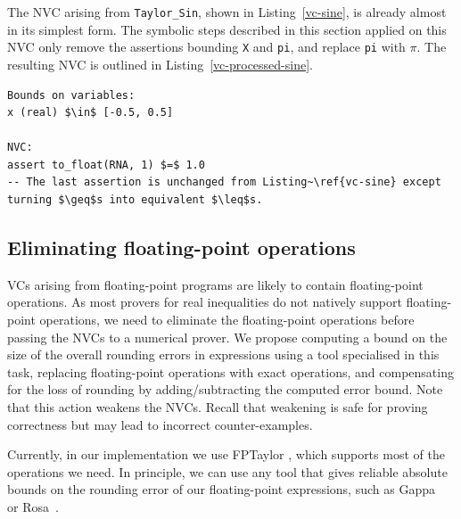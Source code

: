 \documentclass[runningheads]{llncs}
\begin{document}
The NVC arising from \lstinline{Taylor_Sin}, shown in Listing~\ref{vc-sine}, is already almost in its simplest form.  
The symbolic steps described in this section applied on this NVC only remove the assertions bounding \lstinline{X} and \lstinline{pi}, and replace \lstinline{pi} with $\pi$. 
The resulting NVC is outlined in Listing~\ref{vc-processed-sine}.

\begin{lstlisting}[float=t,caption=\lstinline{Taylor_Sin} NVC after simplification and bounds derivation, label=vc-processed-sine,basicstyle=\fontsize{7.5}{9pt}\tt]
Bounds on variables:
x (real) $\in$ [-0.5, 0.5] 

NVC:
assert to_float(RNA, 1) $=$ 1.0
-- The last assertion is unchanged from Listing~\ref{vc-sine} except turning $\geq$s into equivalent $\leq$s.
\end{lstlisting}

\subsection{Eliminating floating-point operations}\label{sec:elim:rounding}

VCs arising from floating-point programs are likely to contain floating-point operations.
As most provers for real inequalities do not natively support floating-point operations, we need to eliminate the floating-point operations before passing the NVCs to a numerical prover. 
We propose computing a bound on the size of the overall rounding errors in expressions using a tool specialised in this task,
replacing floating-point operations with exact operations, 
and compensating for the loss of rounding by adding/subtracting the computed error bound.
Note that this action weakens the NVCs. 
Recall that weakening is safe for proving correctness but may lead to incorrect counter-examples.

Currently, in our implementation we use FPTaylor \cite{solovyev2018-FPTaylor}, which supports most of the operations we need.
In principle, we can use any tool that gives reliable absolute bounds on the rounding error of our floating-point expressions, such as Gappa~\cite{10.1145/1644001.1644003} or Rosa~\cite{darulova2017-Rosa}.
\end{document}
